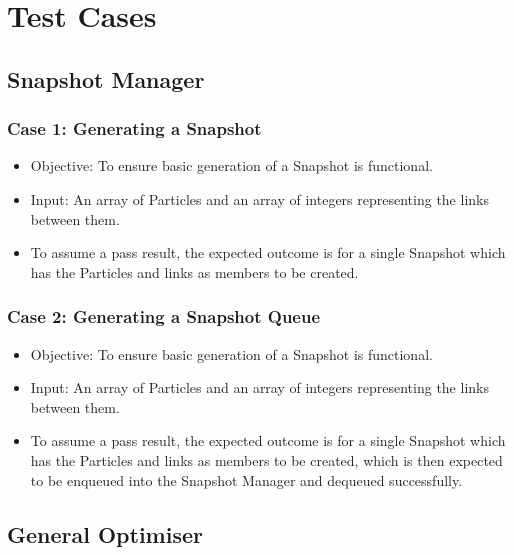 \documentclass[11pt]{article}
\begin{document}
\section{Test Cases}
\subsection{Snapshot Manager}
\subsubsection{Case 1: Generating a Snapshot}
\begin{itemize}
    \item Objective: To ensure basic generation of a Snapshot is functional.
    \item Input: An array of Particles and an array of integers representing the links between them.
    \item To assume a pass result, the expected outcome is for a single Snapshot which has the Particles and links as members to be created.
\end{itemize}

\subsubsection{Case 2: Generating a Snapshot Queue}
\begin{itemize}
    \item Objective: To ensure basic generation of a Snapshot is functional.
    \item Input: An array of Particles and an array of integers representing the links between them.
    \item To assume a pass result, the expected outcome is for a single Snapshot which has the Particles and links as members to be created, which is then expected to be enqueued into the Snapshot Manager and dequeued successfully.
\end{itemize}

\subsection{General Optimiser}
\end{document}
